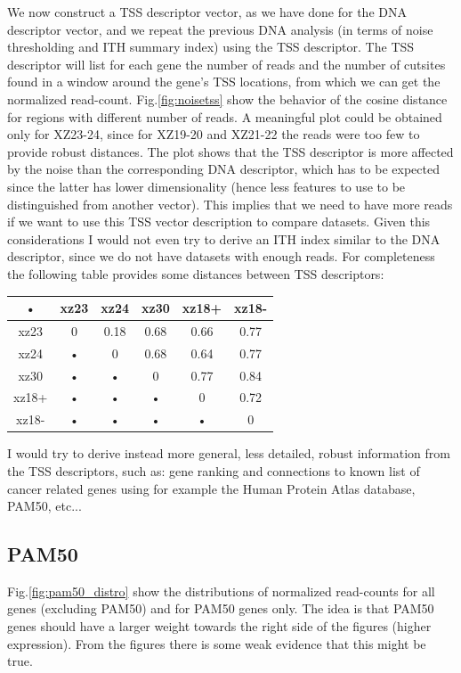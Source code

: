 \documentclass[11pt,a4paper]{article}
\begin{document}
We now construct a TSS descriptor vector, as we have done for the DNA 
descriptor vector, and we repeat the previous DNA analysis (in terms of noise 
thresholding and ITH summary index) using the TSS descriptor. The TSS 
descriptor will list for each gene the number of reads and the number of 
cutsites found in a window around the gene's TSS locations, from which we can 
get the normalized read-count. Fig.\ref{fig:noisetss} show the behavior of the 
cosine distance for regions with different number of reads. A meaningful plot 
could be obtained only for XZ23-24, since for XZ19-20 and XZ21-22  the reads 
were too few to provide robust distances. The plot shows that the TSS descriptor is more affected by the noise than the corresponding DNA descriptor, which has to be expected since the latter has lower dimensionality (hence less features to use to be distinguished from another vector). This implies that we need to have more reads if we want to use this TSS vector description to compare datasets. Given this considerations I would not even try to derive an ITH index similar to the DNA descriptor, since we do not have datasets with enough reads. For completeness the following table provides some distances 
between TSS descriptors:

\begin{tabular}{|c|c|c|c|c|c|}
\hline 
• & xz23 & xz24 & xz30 & xz18+ & xz18- \\ 
\hline 
xz23 & 0 & 0.18 & 0.68 & 0.66 & 0.77 \\ 
\hline 
xz24 & • & 0 & 0.68 & 0.64 & 0.77 \\ 
\hline 
xz30 & • & • & 0 & 0.77 & 0.84 \\ 
\hline 
xz18+ & • & • & • & 0 & 0.72 \\ 
\hline 
xz18- & • & • & • & • & 0 \\ 
\hline 
\end{tabular} 
\newline

I would try to derive instead more general, less detailed, robust information 
from the TSS descriptors, such as: gene ranking and connections to known list of cancer related genes using for example the Human Protein Atlas database, PAM50, etc...
\subsection{PAM50}
Fig.\ref{fig:pam50_distro} show the distributions of normalized read-counts for all genes (excluding PAM50) and for PAM50 genes only. The idea is that PAM50 genes should have a larger weight towards the right side of the figures (higher expression). From the figures there is some weak evidence that this might be true.
\end{document}

